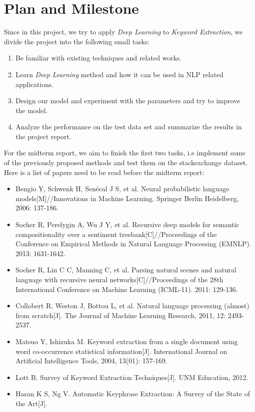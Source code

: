 \documentclass[dvips,12pt]{article}
\begin{document}
	\section{Plan and Milestone}
	Since in this project, we try to apply \emph{Deep Learning} to \emph{Keyword Extraction}, we divide the project into the following small tasks:
	\begin{enumerate}
		\item Be familiar with existing techniques and related works.
		\item Learn \emph{Deep Learning} method and how it can be used in NLP related applications.
		\item Design our model and  experiment with the parameters and try to improve the model.
		\item Analyze the performance on the test data set and summarize the results in the project report.
	\end{enumerate}
	For the midterm report, we aim to finish the first two tasks, i.e implement some of the previously proposed methods and test them on the stackexchange dataset. \\
    Here is a list of papers need to be read before the midterm report:
    \begin{itemize}
        \item Bengio Y, Schwenk H, Senécal J S, et al. Neural probabilistic language models[M]//Innovations in Machine Learning. Springer Berlin Heidelberg, 2006: 137-186.
        \item Socher R, Perelygin A, Wu J Y, et al. Recursive deep models for semantic compositionality over a sentiment treebank[C]//Proceedings of the Conference on Empirical Methods in Natural Language Processing (EMNLP). 2013: 1631-1642.
        \item Socher R, Lin C C, Manning C, et al. Parsing natural scenes and natural language with recursive neural networks[C]//Proceedings of the 28th International Conference on Machine Learning (ICML-11). 2011: 129-136.
        \item Collobert R, Weston J, Bottou L, et al. Natural language processing (almost) from scratch[J]. The Journal of Machine Learning Research, 2011, 12: 2493-2537.
        \item Matsuo Y, Ishizuka M. Keyword extraction from a single document using word co-occurrence statistical information[J]. International Journal on Artificial Intelligence Tools, 2004, 13(01): 157-169.
        \item Lott B. Survey of Keyword Extraction Techniques[J]. UNM Education, 2012.
        \item Hasan K S, Ng V. Automatic Keyphrase Extraction: A Survey of the State of the Art[J].
    \end{itemize}
\end{document}
